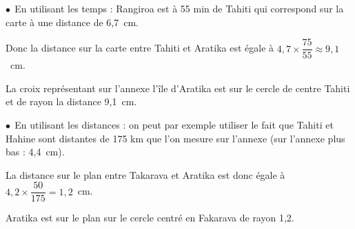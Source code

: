 
\medskip

% 
%
% 
%
%
%
%  
$\bullet~~$En utilisant les temps : Rangiroa est à 55 min de Tahiti qui correspond sur la carte à une distance de 6,7~cm.

Donc la distance sur la carte entre Tahiti et Aratika est égale à $4,7 \times \dfrac{75}{55} \approx 9,1$~cm.

La croix représentant sur l'annexe l'île d'Aratika est sur le cercle de centre Tahiti et de rayon la distance 9,1~cm.

$\bullet~~$En utilisant les distances : on peut par exemple utiliser le fait que Tahiti et Hahine sont distantes de 175 km que l'on mesure sur l'annexe (sur l'annexe plus bas : 4,4~cm).

La distance sur le plan entre Takarava et Aratika est donc égale à $4,2 \times \dfrac{50}{175} = 1,2$~cm.

Aratika est sur le plan sur le cercle centré en Fakarava de rayon 1,2.

